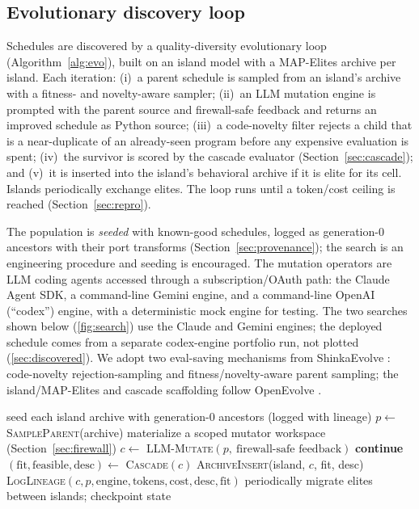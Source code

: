 \documentclass[11pt]{article}
\begin{document}
\subsection{Evolutionary discovery loop}
\label{sec:evo}
Schedules are discovered by a quality-diversity evolutionary loop
(Algorithm~\ref{alg:evo}), built on an island model with a MAP-Elites archive
\citep{mouret2015mapelites} per island. Each iteration: (i)~a parent schedule is
sampled from an island's archive with a fitness- and novelty-aware sampler; (ii)~an
LLM mutation engine is prompted with the parent source and firewall-safe feedback and
returns an improved schedule as Python source; (iii)~a code-novelty filter rejects a
child that is a near-duplicate of an already-seen program before any expensive
evaluation is spent; (iv)~the survivor is scored by the cascade evaluator
(Section~\ref{sec:cascade}); and (v)~it is inserted into the island's behavioral
archive if it is elite for its cell. Islands periodically exchange elites. The loop
runs until a token/cost ceiling is reached (Section~\ref{sec:repro}).

The population is \emph{seeded} with known-good schedules, logged as generation-0
ancestors with their port transforms (Section~\ref{sec:provenance}); the search is an
engineering procedure and seeding is encouraged. The mutation operators are LLM coding
agents accessed through a subscription/OAuth path: the Claude Agent SDK, a command-line
Gemini engine, and a command-line OpenAI (``codex'') engine, with a deterministic mock
engine for testing. The two searches shown below (\cref{fig:search}) use the Claude and Gemini engines; the
deployed schedule comes from a separate codex-engine portfolio run, not plotted
(\cref{sec:discovered}). We adopt two eval-saving mechanisms from ShinkaEvolve
\citep{shinka2025}: code-novelty rejection-sampling and fitness/novelty-aware parent
sampling; the island/MAP-Elites and cascade scaffolding follow OpenEvolve
\citep{openevolve2025}.

\begin{algorithm}[t]
\caption{Evolutionary schedule discovery}
\label{alg:evo}
\begin{algorithmic}[1]
\State seed each island archive with generation-0 ancestors (logged with lineage)
    \State $p \gets$ \textsc{SampleParent}(archive) 
    \State materialize a scoped mutator workspace (Section~\ref{sec:firewall})
    \State $c \gets$ \textsc{LLM-Mutate}$(p,\ \text{firewall-safe feedback})$
     \textbf{continue} \EndIf
    \State $(\text{fit}, \text{feasible}, \text{desc}) \gets$ \textsc{Cascade}$(c)$
     \textsc{ArchiveInsert}(island, $c$, fit, desc) \EndIf
    \State \textsc{LogLineage}$(c, p, \text{engine}, \text{tokens}, \text{cost}, \text{desc}, \text{fit})$
  \EndFor
  \State periodically migrate elites between islands; checkpoint state
\EndWhile
\end{algorithmic}
\end{algorithm}
\end{document}
